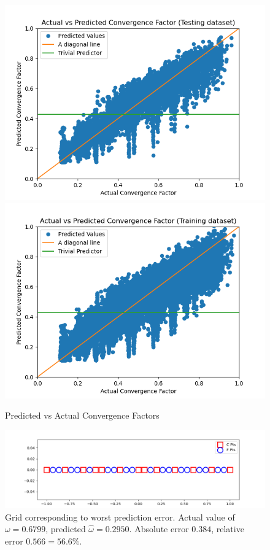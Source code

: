 \begin{figure}[h]
  \centering
  \includegraphics[scale=0.7]{figures/jacobi-conv/conv_test_pred.png}
  \includegraphics[scale=0.7]{figures/jacobi-conv/conv_train_pred.png}
  \caption{Predicted vs Actual Convergence Factors}
  \label{fig:conv_preds}
\end{figure}

\begin{figure}[h]
  \centering
  \includegraphics[scale=0.7]{figures/jacobi-conv/conv_peak_worst_err.png}
  \caption{Grid corresponding to worst prediction error.  Actual value of $\omega=0.6799$, predicted $\hat{\omega} = 0.2950$.  Absolute error $0.384$, relative error $0.566=56.6\%$.}
  \label{fig:worst}
\end{figure}


